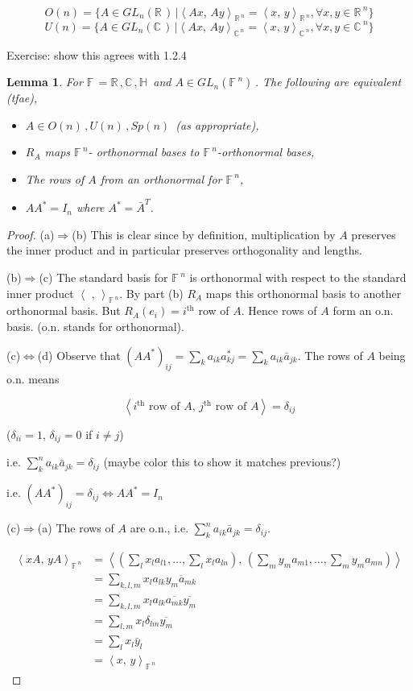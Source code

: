 \documentclass[12pt,a4paper]{article}
\newcommand{\rR}{\ensuremath{\mathbb{R}\,}}
\newcommand{\cC}{\ensuremath{\mathbb{C}\,}}
\newcommand{\hH}{\ensuremath{\mathbb{H}\,}}
\newcommand{\fF}{\ensuremath{\mathbb{F}\,}}
\newcommand{\glnr}{\ensuremath{GL_n(\rR)\,}}
\newcommand{\glnc}{\ensuremath{GL_n(\cC)\,}}
\newcommand{\glnf}{\ensuremath{GL_n(\fF^n)\,}}
\newcommand{\gon}{\ensuremath{O(n)\,}}
\newcommand{\gun}{\ensuremath{U(n)\,}}
\newcommand{\gspn}{\ensuremath{Sp(n)\,}}
\newcommand{\ra}{\ensuremath{\Rightarrow}}
\newcommand{\ipm}[2]{\ensuremath{\left\langle #1, \, #2 \right\rangle}}
\newtheorem{lemma}[thm]{Lemma}
\begin{document}
\[O(n)=\{A\in \glnr | \ipm{Ax}{Ay}_{\rR^{n}}=\ipm{x}{y}_{\rR^{n}}, \forall x,y \in \rR^n\}\]
\[U(n)=\{A\in \glnc | \ipm{Ax}{Ay}_{\cC^{n}}=\ipm{x}{y}_{\cC^{n}}, \forall x,y \in \cC^n\}\]

Exercise: show this agrees with 1.2.4

\begin{lemma}
For $\fF=\rR, \cC,\hH$ and $A\in \glnf$. The following are equivalent (tfae),

\begin{itemize}
\item[a)] $A \in \gon, \gun, \gspn$ (as appropriate),
\item[b)] $R_A$ maps $\fF^n$- orthonormal bases to $\fF^n$-orthonormal bases,
\item[c)] The rows of $A$ from an orthonormal for $\fF^n$,
\item[d)] $AA^*=I_n$ where $A^*=\bar{A}^T$.
\end{itemize}
\end{lemma}

\begin{proof}
(a)$\ra$(b) This is clear since by definition, multiplication by $A$ preserves the inner product and in particular preserves orthogonality and lengths.

(b)$\ra$(c) The standard basis for $\fF^n$ is orthonormal with respect to the standard inner product $\ipm{\,\,}{}_{\fF^n}$. By part (b) $R_A$ maps this orthonormal basis to another orthonormal basis. But $R_A(e_i)=i^{\text{th}}$ row of $A$. Hence rows of $A$ form an o.n. basis. (o.n. stands for orthonormal).

(c)$\iff$(d) Observe that $(AA^*)_{ij}=\sum\limits_k a_{ik}a^*_{kj}=\sum\limits_k a_{ik}\bar{a}_{jk}$. The rows of $A$ being o.n. means 

\[\ipm{i^{\text{th}}\text{ row of } A }{j^{\text{th}}\text{ row of } A }=\delta_{ij}\]

($\delta_{ii}=1$, $\delta_{ij}=0$ if $i\neq j$)

i.e. $\sum\limits_k^n a_{ik}\bar{a}_{jk}=\delta_{ij}$ (maybe color this to show it matches previous?)

i.e. $(AA^*)_{ij}=\delta_{ij} \iff AA^*=I_n$

(c)$\ra$(a) The rows of $A$ are o.n., i.e. $\sum\limits_k^n a_{ik}\bar{a}_{jk}=\delta_{ij}$.

\begin{align*}
\ipm{xA}{yA}_{\fF^n}&=\ipm{\left(\sum_l x_l a_{l1},\ldots, \sum_l x_l a_{ln}\right) }{\left(\sum_m y_m a_{m1},\ldots,\sum_m y_m a_{mn}\right)}\\
&=\sum_{k,l,m} x_l a_{lk} \overline{y_m a_{mk}}\\
&=\sum_{k,l,m} x_l a_{lk} \overline{a_{mk}}\overline{y_m }\\
&=\sum_{l,m} x_l\delta_{lm}\overline{y_m }\\
&= \sum_l x_l \bar{y}_l\\
&= \ipm{x}{y}_{\fF^n}
\end{align*}

\end{proof}
\end{document}
